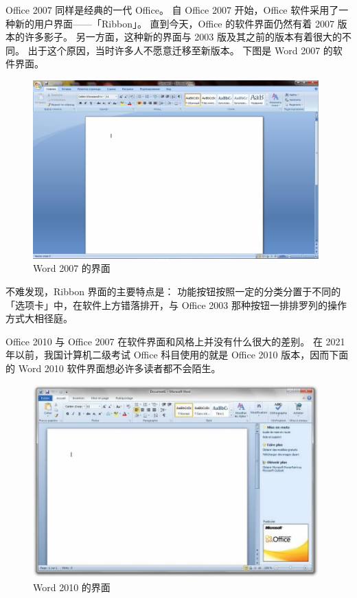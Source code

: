 Office 2007 同样是经典的一代 Office。
自 Office 2007 开始，Office 软件采用了一种新的用户界面——「Ribbon」。
直到今天，Office 的软件界面仍然有着 2007 版本的许多影子。
另一方面，这种新的界面与 2003 版及其之前的版本有着很大的不同。
出于这个原因，当时许多人不愿意迁移至新版本。
下图是 Word 2007 的软件界面。

\begin{figure}[htb!]
  \centering
  \includegraphics[width=11cm]{assets/Word_2007.jpg}
  \caption{Word 2007 的界面}
  \label{Word_2007}
\end{figure}

不难发现，Ribbon 界面的主要特点是：
功能按钮按照一定的分类分置于不同的「选项卡」中，在软件上方错落排开，与 Office 2003 那种按钮一排排罗列的操作方式大相径庭。

Office 2010 与 Office 2007 在软件界面和风格上并没有什么很大的差别。
在 2021 年以前，我国计算机二级考试 Office 科目使用的就是 Office 2010 版本，因而下面的 Word 2010 软件界面想必许多读者都不会陌生。

\begin{figure}[htb!]
  \centering
  \includegraphics[width=11cm]{assets/Word_2010.jpg}
  \caption{Word 2010 的界面}
  \label{Word_2010}
\end{figure}

